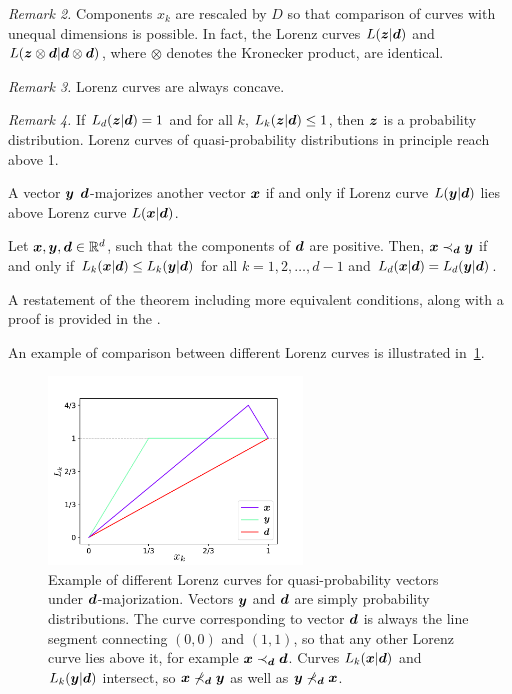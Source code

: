 \emph{Remark 2.} Components $x_k$ are rescaled by $D$ so that comparison of curves with unequal dimensions is possible.
In fact, the Lorenz curves $L(\bm{z}|\bm{d})$ and $L(\bm{z} \otimes \bm{d}|\bm{d} \otimes \bm{d})$, where $\otimes$ denotes the Kronecker product, are identical.

\emph{Remark 3.} Lorenz curves are always concave.

\emph{Remark 4.} If $L_d(\bm{z}|\bm{d}) = 1$ and for all $k$, $L_k(\bm{z}|\bm{d}) \leq 1$, then $\bm{z}$ is a probability distribution.
Lorenz curves of quasi-probability distributions in principle reach above 1.

A vector $\bm{y}$ $\bm{d}$-majorizes another vector $\bm{x}$  if and only if Lorenz curve $L(\bm{y}|\bm{d})$ lies above Lorenz curve $L(\bm{x}|\bm{d})$.
\begin{theorem}\label{thm:dmajor}
    Let $\bm{x}, \bm{y}, \bm{d} \in \mathbb{R}^d$, such that the components of $\bm{d}$ are positive. 
    Then, $\bm{x} \prec_{\bm{d}} \bm{y}$ if and only if $L_k(\bm{x}|\bm{d}) \leq L_k(\bm{y}|\bm{d})$ for all $k=1,2,\dots, d-1$ and $L_d(\bm{x}|\bm{d}) = L_d(\bm{y}|\bm{d})$.
\end{theorem}
A restatement of the theorem including more equivalent conditions, along with a proof is provided in the .

An example of comparison between different Lorenz curves is illustrated in~\cref{fig:lctoy}.
\begin{figure}
    \centering
    \includegraphics[height=5cm]{sections/major/lctoy.pdf}
    \caption{Example of different Lorenz curves for quasi-probability vectors under $\bm{d}$-majorization.
    Vectors $\bm{y}$ and $\bm{d}$ are simply probability distributions.
    The curve corresponding to vector $\bm{d}$ is always the line segment connecting $(0,0)$ and $(1,1)$, so that any other Lorenz curve lies above it, for example $\bm{x} \prec_{\bm{d}} \bm{d}$.
    Curves $L_k(\bm{x}|\bm{d})$ and $L_k(\bm{y}|\bm{d})$ intersect, so $\bm{x} \nprec_{\bm{d}} \bm{y}$ as well as $\bm{y} \nprec_{\bm{d}} \bm{x}$.
    }
    \label{fig:lctoy}
\end{figure}

